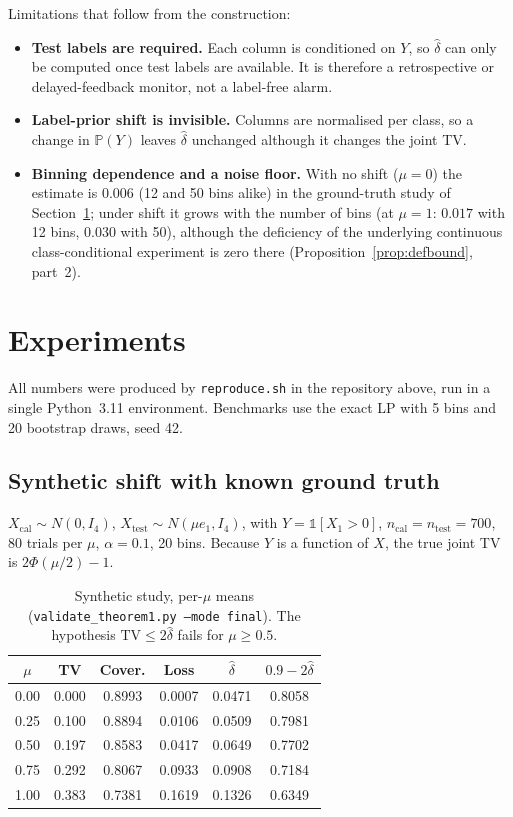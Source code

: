 \documentclass{article}
\renewcommand{\P}{\mathbb{P}}
\begin{document}
Limitations that follow from the construction:
\begin{itemize}
  \item \textbf{Test labels are required.} Each column is conditioned on $Y$, so
  $\hat\delta$ can only be computed once test labels are available. It is
  therefore a retrospective or delayed-feedback monitor, not a label-free
  alarm.
  \item \textbf{Label-prior shift is invisible.} Columns are normalised per
  class, so a change in $\P(Y)$ leaves $\hat\delta$ unchanged although it
  changes the joint TV.
  \item \textbf{Binning dependence and a noise floor.} With no shift
  ($\mu=0$) the estimate is $0.006$ (12 and 50 bins alike) in the ground-truth
  study of Section~\ref{sec:experiments}; under shift it grows with the number
  of bins (at $\mu=1$: $0.017$ with 12 bins, $0.030$ with 50), although the
  deficiency of the underlying continuous class-conditional experiment is
  zero there (Proposition~\ref{prop:defbound}, part~2).
\end{itemize}

\section{Experiments}
\label{sec:experiments}

All numbers were produced by \texttt{reproduce.sh} in the repository above,
run in a single Python~3.11 environment. Benchmarks use the
exact LP with 5 bins and 20 bootstrap draws, seed 42.

\subsection{Synthetic shift with known ground truth}

$X_{\mathrm{cal}}\sim N(0,I_4)$, $X_{\mathrm{test}}\sim N(\mu e_1,I_4)$, with
$Y=\mathbb 1[X_1>0]$, $n_{\mathrm{cal}}=n_{\mathrm{test}}=700$, 80 trials per
$\mu$, $\alpha=0.1$, 20 bins. Because $Y$ is a function of $X$, the true joint
TV is $2\Phi(\mu/2)-1$.

\begin{table}[t]
\centering\small
\begin{tabular}{cccccc}
\toprule
$\mu$ & TV & Cover. & Loss & $\hat\delta$ & $0.9-2\hat\delta$ \\
\midrule
0.00 & 0.000 & 0.8993 & 0.0007 & 0.0471 & 0.8058 \\
0.25 & 0.100 & 0.8894 & 0.0106 & 0.0509 & 0.7981 \\
0.50 & 0.197 & 0.8583 & 0.0417 & 0.0649 & 0.7702 \\
0.75 & 0.292 & 0.8067 & 0.0933 & 0.0908 & 0.7184 \\
1.00 & 0.383 & 0.7381 & 0.1619 & 0.1326 & 0.6349 \\
\bottomrule
\end{tabular}
\caption{Synthetic study, per-$\mu$ means (\texttt{validate\_theorem1.py --mode final}).
The hypothesis $\mathrm{TV}\le2\hat\delta$ fails for $\mu\ge0.5$.}
\label{tab:synthetic}
\end{table}
\end{document}
